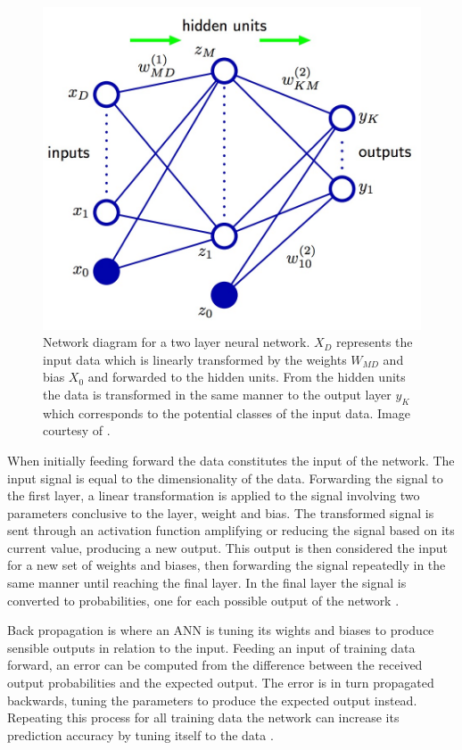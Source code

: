 \begin{figure}[ht!]
  \centering
  \includegraphics[width=0.7\linewidth]{images/ANN_representation.jpg}
  \caption[]
  {\small Network diagram for a two layer neural network. $X_D$ represents the input data which is linearly transformed by the weights $W_{MD}$ and bias $X_0$ and forwarded to the hidden units. From the hidden units the data is transformed in the same manner to the output layer $y_K$ which corresponds to the potential classes of the input data. Image courtesy of \textcite{Bishop:2006}.}
  \label{fig:ANN_representation}
\end{figure}


When initially feeding forward the data constitutes the input of the network. The input signal is equal to the dimensionality of the data. Forwarding the signal to the first layer, a linear transformation is applied to the signal involving two parameters conclusive to the layer, weight and bias. The transformed signal is sent through an activation function amplifying or reducing the signal based on its current value, producing a new output. This output is then considered the input for a new set of weights and biases, then forwarding the signal repeatedly in the same manner until reaching the final layer. In the final layer the signal is converted to probabilities, one for each possible output of the network \parencite{Bishop:2006}.

Back propagation is where an ANN is tuning its wights and biases to produce sensible outputs in relation to the input. Feeding an input of training data forward, an error can be computed from the difference between the received output probabilities and the expected output. The error is in turn propagated backwards, tuning the parameters to produce the expected output instead. Repeating this process for all training data the network can increase its prediction accuracy by tuning itself to the data \parencite{Bishop:2006}.

